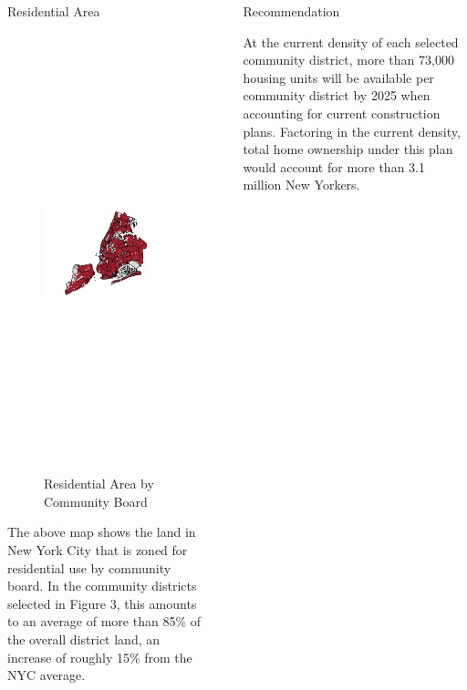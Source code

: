 \documentclass[final]{beamer}
\newlength{\sepwidth}
\newlength{\colwidth}
\newcommand{\separatorcolumn}{\begin{column}{\sepwidth}\end{column}}
\begin{document}
\begin{frame}[t]
\begin{columns}[t]
\begin{column}{\colwidth}
\begin{block}{Residential Area}


    \begin{figure}
        \centering
        \includegraphics[height = 5in]{pics/zone_map.png}
        \caption{Residential Area by Community Board}
        \label{fig:my_label}
    \end{figure}
    
    \vspace{-1.5cm}
    
    The above map shows the land in New York City that is zoned for residential use by community board. In the community districts selected in Figure 3, this amounts to an average of more than 85\% of the overall district land, an increase of roughly 15\% from the NYC average.

\end{block}  
  
\end{column}

\separatorcolumn

\begin{column}{\colwidth}

  \begin{block}{Recommendation}

    At the current density of each selected community district, more than 73,000 housing units will be available per community district by 2025 when accounting for current construction plans. Factoring in the current density, total home ownership under this plan would account for more than 3.1 million New Yorkers.
    

\end{block}
\end{column}
\end{columns}
\end{frame}
\end{document}
